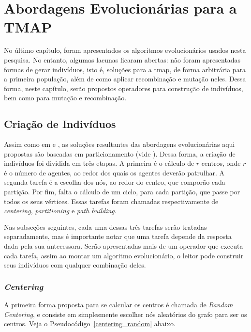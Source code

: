 \chapter{Abordagens Evolucionárias para a TMAP}
\label{chp:abordagens}

No último capítulo, foram apresentados os algoritmos evolucionários usados nesta 
pesquisa. No entanto, algumas lacunas ficaram abertas: não foram apresentadas 
formas de gerar indivíduos, isto é, soluções para a \ac{tmap}, de forma 
arbitrária para a primeira população, além de como aplicar 
recombinação e mutação neles. Dessa forma, neste capítulo, serão propostos 
operadores para construção de indivíduos, bem como para mutação e recombinação.

\section{Criação de Indivíduos}

Assim como em \citep{Pippin:2013:PBT:2480362.2480378} e \citep{4630897}, as 
soluções resultantes das abordagens evolucionárias aqui propostas são baseadas 
em particionamento (vide ). Dessa forma, a criação de 
indivíduos foi dividida em três etapas. A primeira é o cálculo de $r$ centros, 
onde $r$ é o número de agentes, ao redor dos quais os agentes deverão patrulhar. 
A segunda tarefa é a escolha dos nós, ao redor do centro, que comporão cada 
partição. Por fim, falta o cálculo de um ciclo, para cada partição, que passe 
por todos os seus vértices. Essas tarefas foram chamadas respectivamente de 
\textit{centering}, \textit{partitioning} e \textit{path building}.

Nas subseções seguintes, cada uma dessas três tarefas serão tratadas 
separadamente, mas é importante notar que uma tarefa depende da resposta dada 
pela sua antecessora. Serão apresentadas mais de um operador que executa cada 
tarefa, assim ao montar um algoritmo evolucionário, o leitor pode construir 
seus indivíduos com qualquer combinação deles.

\subsection{\textit{Centering}}

A primeira forma proposta para se calcular os centros é chamada de 
\textit{Random Centering}, e consiste em simplesmente escolher nós aleatórios do 
grafo para ser os centros. Veja o Pseudocódigo~\ref{centering_random} abaixo.

